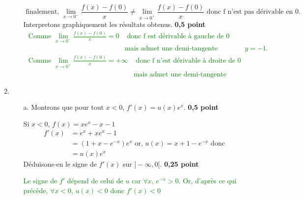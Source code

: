 \documentclass[12pt]{article}
\begin{document}
\begin{enumerate}
\begin{enumerate}
\[\text{ finalement, }\lim_{x \to 0^{-}} \frac{f(x)-f(0)}{x}\neq\lim_{x \to 0^{+}} \frac{f(x)-f(0)}{x} \text{ donc f n'est pas dérivable en 0.}\] 
	Interpretons  graphiquement les résultats obtenus. \textbf{ 0,5 point}
\textcolor{green}{
\begin{align*}
\text{ Comme }\lim_{x \to 0^{-}} \frac{f(x)-f(0)}{x}=0&\text{ donc f est dérivable à gauche de 0}\\ 
													&\text{mais admet une demi-tangente horizontale d'équation }y=-1.
\end{align*}
}
\textcolor{green}{
 \begin{align*}
\text{ Comme }\lim_{x \to 0^{+}} \frac{f(x)-f(0)}{x}=+\infty & \text{ donc f n'est dérivable à droite de 0}\\ 
													&\text{mais admet une demi-tangente verticale orientée vers le haut. }
\end{align*}
}
\end{enumerate}
\item
\begin{enumerate}
\item[a.] Montrons que pour tout $x < 0 $, $f'(x)=u(x)e^{x}$. \textbf{ 0,5 point}

Si $x < 0 $,  $f(x)=xe^{x}-x-1 $
\begin{align*}
f'(x)&=e^{x}+xe^{x}-1\\
	 &=(1+x-e^{-x})e^{x} \text{ or, } u(x)=x+1-e^{-x} \text{ donc }\\
	 &=u(x)e^{x}
\end{align*}
	Déduisons-en le signe de $f'(x)$ sur $]-\infty, 0[.$ \textbf{ 0,25 point}
	
\textcolor{green}{Le signe de $f'$ dépend de celui de $u$ car $\forall x$, $e^{-x}>0$. Or, d'après ce qui précède,
$\forall x<0$, $u(x)<0$ donc $f'(x)<0$}
	

\end{enumerate}
\end{enumerate}
\end{document}
